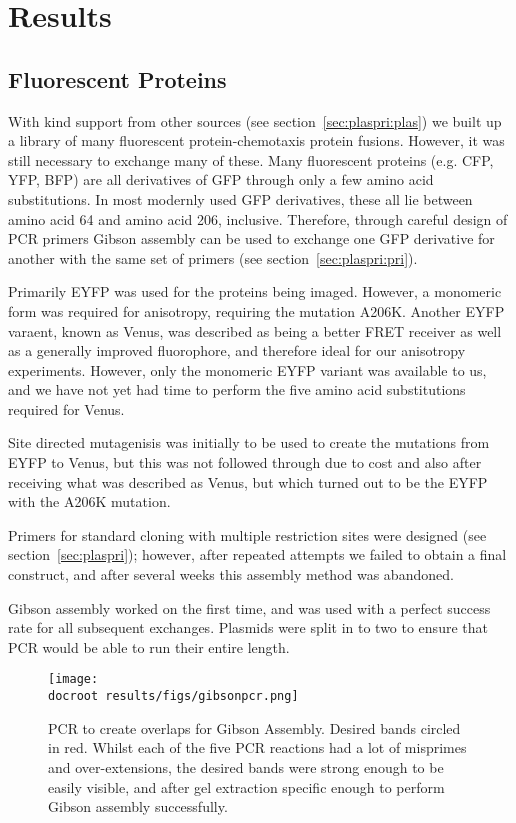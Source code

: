 \documentclass[../main.tex]{subfiles}
\begin{document}
\section{Results}


\subsection{Fluorescent Proteins}

With kind support from other sources (see section~\ref{sec:plaspri:plas}) we built up a library of many fluorescent protein-chemotaxis protein fusions. However, it was still necessary to exchange many of these. Many fluorescent proteins (e.g. CFP, YFP, BFP) are all derivatives of GFP through only a few amino acid substitutions\citep{tsien98}. In most modernly used GFP derivatives, these all lie between amino acid 64 and amino acid 206, inclusive. Therefore, through careful design of PCR primers Gibson assembly can be used to exchange one GFP derivative for another with the same set of primers (see section~\ref{sec:plaspri:pri}).

Primarily EYFP was used for the proteins being imaged. However, a monomeric form was required for anisotropy\citep{vaknin07}, requiring the mutation A206K. Another EYFP varaent, known as Venus, was described as being a better FRET receiver\citep{nagai02} as well as a generally improved fluorophore, and therefore ideal for our anisotropy experiments. However, only the monomeric EYFP variant was available to us, and we have not yet had time to perform the five amino acid substitutions required for Venus.

Site directed mutagenisis was initially to be used to create the mutations from EYFP to Venus, but this was not followed through due to cost and also after receiving what was described as Venus, but which turned out to be the EYFP with the A206K mutation.

Primers for standard cloning with multiple restriction sites were designed (see section~\ref{sec:plaspri}); however, after repeated attempts we failed to obtain a final construct, and after several weeks this assembly method was abandoned.

Gibson assembly worked on the first time, and was used with a perfect success rate for all subsequent exchanges. Plasmids were split in to two to ensure that PCR would be able to run their entire length. 

\begin{figure}
\begin{center}
\texttt{[image: \\docroot results/figs/gibsonpcr.png]}
\caption[Overlap PCR]{PCR to create overlaps for Gibson Assembly. Desired bands circled in red. Whilst each of the five PCR reactions had a lot of misprimes and over-extensions, the desired bands were strong enough to be easily visible, and after gel extraction specific enough to perform Gibson assembly successfully.}
\end{center}
\end{figure}
\newpage
\end{document}
